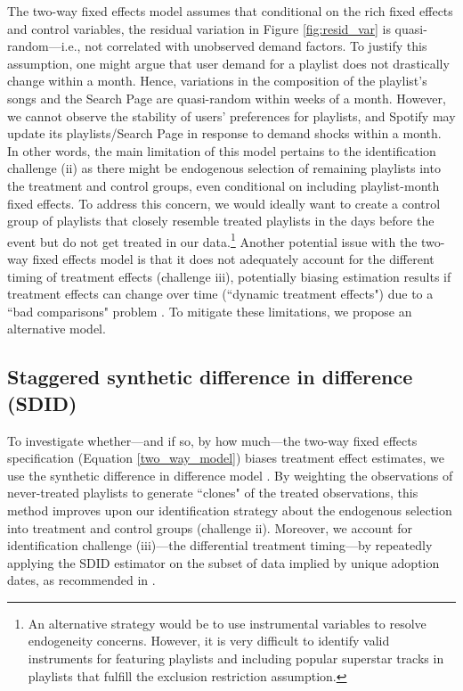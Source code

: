 The two-way fixed effects model assumes that conditional on the rich fixed effects and control variables, the residual variation in Figure \ref{fig:resid_var} is quasi-random---i.e., not correlated with unobserved demand factors. To justify this assumption, one might argue that user demand for a playlist does not drastically change within a month. Hence, variations in the composition of the playlist's songs and the Search Page are quasi-random within weeks of a month. However, we cannot observe the stability of users' preferences for playlists, and Spotify may update its playlists/Search Page in response to demand shocks within a month. %
In other words, the main limitation of this model pertains to the identification challenge (ii) as there might be endogenous selection of remaining playlists into the treatment and control groups, even conditional on including playlist-month fixed effects. To address this concern, we would ideally want to create a control group of playlists that closely resemble treated playlists in the days before the event but do not get treated in our data.\footnote{An alternative strategy would be to use instrumental variables to resolve endogeneity concerns. However, it is very difficult to identify valid instruments for featuring playlists and including popular superstar tracks in playlists that fulfill the exclusion restriction assumption.} Another potential issue with the two-way fixed effects model is that it does not adequately account for the different timing of treatment effects (challenge iii), potentially biasing estimation results if treatment effects can change over time (``dynamic treatment effects") due to a ``bad comparisons" problem \citep{baker2022much}. To mitigate these limitations, we propose an alternative model. 

\subsection{Staggered synthetic difference in difference (SDID)} 

\label{SDID}

To investigate whether---and if so, by how much---the two-way fixed effects specification (Equation \ref{two_way_model}) biases treatment effect estimates, we use the synthetic difference in difference model \citep{SDiD_AER_Arkhangelsky_21}. By weighting the observations of never-treated playlists to generate ``clones" of the treated observations, this method improves upon our identification strategy about the endogenous selection into treatment and control groups (challenge ii). Moreover, we account for identification challenge (iii)---the differential treatment timing---by repeatedly applying the SDID estimator on the subset of data implied by unique adoption dates, as recommended in \cite{SDiD_AER_Arkhangelsky_21}.

